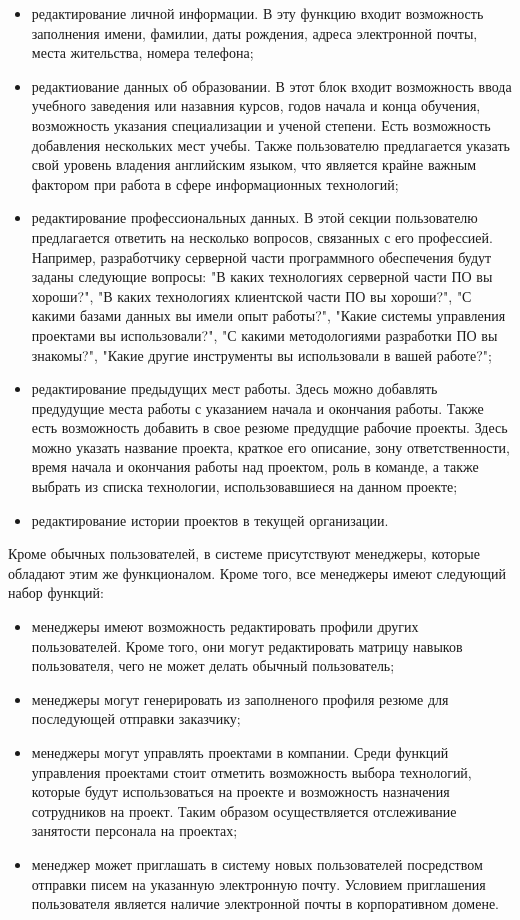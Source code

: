\begin{itemize}
	\item редактирование личной информации. В эту функцию входит возможность заполнения имени, фамилии, даты рождения,
	адреса электронной почты, места жительства, номера телефона;
  \item редактиование данных об образовании. В этот блок входит возможность ввода учебного заведения или назавния курсов,
  годов начала и конца обучения, возможность указания специализации и ученой степени. Есть возможность добавления
  нескольких мест учебы. Также пользователю предлагается указать свой уровень владения английским языком, что
  является крайне важным фактором при работа в сфере информационных технологий;
	\item редактирование профессиональных данных. В этой секции пользователю предлагается ответить на несколько вопросов,
  связанных с его профессией. Например, разработчику серверной части программного обеспечения будут заданы следующие
  вопросы: "В каких технологиях серверной части ПО вы хороши?", "В каких технологиях клиентской части ПО вы хороши?",
  "С какими базами данных вы имели опыт работы?", "Какие системы управления проектами вы использовали?",
  "С какими методологиями разработки ПО вы знакомы?", "Какие другие инструменты вы использовали в вашей работе?";
	\item редактирование предыдущих мест работы. Здесь можно добавлять предудущие места работы с указанием начала и
  окончания работы. Также есть возможность добавить в свое резюме предудщие рабочие проекты. Здесь можно указать название
  проекта, краткое его описание, зону ответственности, время начала и окончания работы над проектом, роль в команде, 
  а также выбрать из списка технологии, использовавшиеся на данном проекте;
	\item редактирование истории проектов в текущей организации.
\end{itemize}

Кроме обычных пользователей, в системе присутствуют менеджеры, которые обладают этим же функционалом. Кроме того,
все менеджеры имеют следующий набор функций:
\begin{itemize}
	\item менеджеры имеют возможность редактировать профили других пользователей. Кроме того, они могут редактировать
  матрицу навыков пользователя, чего не может делать обычный пользователь;
  \item менеджеры могут генерировать из заполненого профиля резюме для последующей отправки заказчику;
  \item менеджеры могут управлять проектами в компании. Среди функций управления проектами стоит отметить возможность
  выбора технологий, которые будут использоваться на проекте и возможность назначения сотрудников на проект. Таким образом
  осуществляется отслеживание занятости персонала на проектах;
  \item менеджер может приглашать в систему новых пользователей посредством отправки писем на указанную электронную
  почту. Условием приглашения пользователя является наличие электронной почты в корпоративном домене.
\end{itemize}

